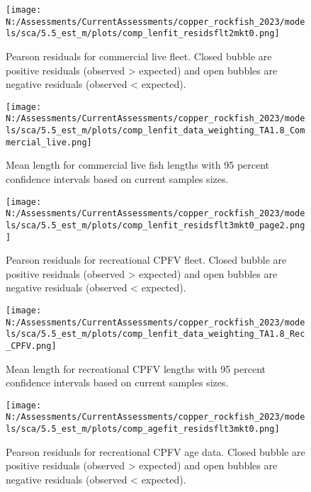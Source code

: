 \documentclass[11pt,
  english,
  letterpaper,
]{article}
\begin{document}
\begin{figure}
\centering
\texttt{[image: N:/Assessments/CurrentAssessments/copper\_rockfish\_2023/models/sca/5.5\_est\_m/plots/comp\_lenfit\_residsflt2mkt0.png]}
\caption{Pearson residuals for commercial live fleet. Closed bubble are positive residuals (observed \textgreater{} expected) and open bubbles are negative residuals (observed \textless{} expected).\label{fig:com-live-pearson}}
\end{figure}

\begin{figure}
\centering
\texttt{[image: N:/Assessments/CurrentAssessments/copper\_rockfish\_2023/models/sca/5.5\_est\_m/plots/comp\_lenfit\_data\_weighting\_TA1.8\_Commercial\_live.png]}
\caption{Mean length for commercial live fish lengths with 95 percent confidence intervals based on current samples sizes.\label{fig:com-live-mean-len-fit}}
\end{figure}

\begin{figure}
\centering
\texttt{[image: N:/Assessments/CurrentAssessments/copper\_rockfish\_2023/models/sca/5.5\_est\_m/plots/comp\_lenfit\_residsflt3mkt0\_page2.png]}
\caption{Pearson residuals for recreational CPFV fleet. Closed bubble are positive residuals (observed \textgreater{} expected) and open bubbles are negative residuals (observed \textless{} expected).\label{fig:rec-cpfv-pearson}}
\end{figure}

\begin{figure}
\centering
\texttt{[image: N:/Assessments/CurrentAssessments/copper\_rockfish\_2023/models/sca/5.5\_est\_m/plots/comp\_lenfit\_data\_weighting\_TA1.8\_Rec\_CPFV.png]}
\caption{Mean length for recreational CPFV lengths with 95 percent confidence intervals based on current samples sizes.\label{fig:rec-cpfv-mean-len-fit}}
\end{figure}

\begin{figure}
\centering
\texttt{[image: N:/Assessments/CurrentAssessments/copper\_rockfish\_2023/models/sca/5.5\_est\_m/plots/comp\_agefit\_residsflt3mkt0.png]}
\caption{Pearson residuals for recreational CPFV age data. Closed bubble are positive residuals (observed \textgreater{} expected) and open bubbles are negative residuals (observed \textless{} expected).\label{fig:rec-cpfv-age-pearson}}
\end{figure}
\end{document}
